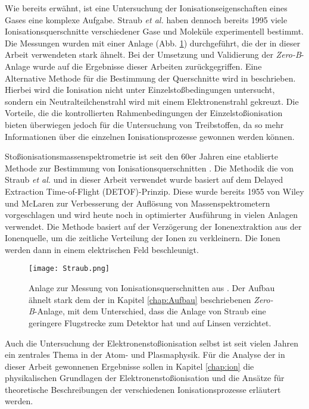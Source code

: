 Wie bereits erwähnt, ist eine Untersuchung der Ionisationseigenschaften eines Gases eine komplexe Aufgabe. Straub \textit{et al.} \cite{Straub}\cite{Straub2} haben dennoch bereits 1995 viele Ionisationsquerschnitte verschiedener Gase und Moleküle experimentell bestimmt. Die Messungen wurden mit einer Anlage (Abb. \ref{fig:Straub}) durchgeführt, die der in dieser Arbeit verwendeten stark ähnelt. Bei der Umsetzung und Validierung der \textit{Zero-B}-Anlage wurde auf die Ergebnisse dieser Arbeiten zurückgegriffen. Eine Alternative Methode für die Bestimmung der Querschnitte wird in \cite{other_method} beschrieben. Hierbei wird die Ionisation nicht unter Einzelstoßbedingungen untersucht, sondern ein Neutralteilchenstrahl wird mit einem Elektronenstrahl gekreuzt. Die Vorteile, die die kontrollierten Rahmenbedingungen der Einzelstoßionisation bieten überwiegen jedoch für die Untersuchung von Treibstoffen, da so mehr Informationen über die einzelnen Ionisationsprozesse gewonnen werden können.

Stoßionisationsmassenspektrometrie ist seit den 60er Jahren eine etablierte Methode zur Bestimmung von Ionisationsquerschnitten \cite{EITOFMS}. Die Methodik die von Straub \textit{et al.} und in dieser Arbeit verwendet wurde basiert auf dem Delayed Extraction Time-of-Flight (DETOF)-Prinzip. Diese wurde bereits 1955 von Wiley und McLaren zur Verbesserung der Auflösung von Massenspektrometern vorgeschlagen \cite{DETOF} und wird heute noch in optimierter Ausführung in vielen Anlagen verwendet. Die Methode basiert auf der Verzögerung der Ionenextraktion aus der Ionenquelle, um die zeitliche Verteilung der Ionen zu verkleinern. Die Ionen werden dann in einem elektrischen Feld beschleunigt.
\begin{figure}
    \centering
    \texttt{[image: Straub.png]}
    \caption[Anlage zur Messung von Ionisationsquerschnitten aus \cite{Straub2}]{Anlage zur Messung von Ionisationsquerschnitten aus \cite{Straub2}. Der Aufbau ähnelt stark dem der in Kapitel \ref{chap:Aufbau} beschriebenen \textit{Zero-B}-Anlage, mit dem Unterschied, dass die Anlage von Straub eine geringere Flugstrecke zum Detektor hat und auf Linsen verzichtet.}
    \label{fig:Straub}
\end{figure}
Auch die Untersuchung der Elektronenstoßionisation selbst ist seit vielen Jahren ein zentrales Thema in der Atom- und Plasmaphysik. Für die Analyse der in dieser Arbeit gewonnenen Ergebnisse sollen in Kapitel \ref{chap:ion} die physikalischen Grundlagen der Elektronenstoßionisation und die Ansätze für theoretische Beschreibungen der verschiedenen Ionisationsprozesse erläutert werden.